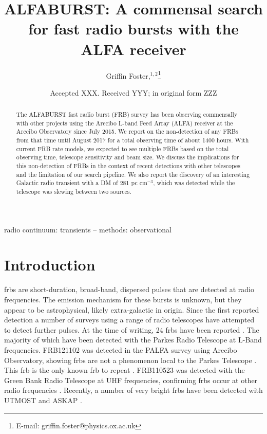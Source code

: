 \documentclass[a4paper,fleqn,usenatbib]{mnras}
\title[The ALFABURST Commensal FRB Survey]{ALFABURST: A commensal search for
fast radio bursts with the ALFA receiver}
\author[G. Foster et al.]{
Griffin Foster,$^{1,2}$\thanks{E-mail: griffin.foster@physics.ox.ac.uk}
\\
}
\date{Accepted XXX. Received YYY; in original form ZZZ}
\begin{document}
\label{firstpage}
\pagerange{\pageref{firstpage}--\pageref{lastpage}}
\maketitle

\begin{abstract}
The ALFABURST fast radio burst (FRB) survey has been observing commensally with
other projects using the Arecibo L-band Feed Array (ALFA) receiver at the Arecibo 
Observatory since July 2015. We report on the non-detection of any FRBs from that 
time until August 2017 for a total observing time of about 1400 hours. With current 
FRB rate models, we expected to see multiple FRBs based on the
total observing time, telescope sensitivity and beam size. We discuss the
implications for this non-detection of FRBs in the context of recent detections
with other telescopes and the limitation of our search pipeline. We also report the 
discovery of an interesting Galactic radio transient with a DM of 281 pc cm$^{-3}$, 
which was detected while the telescope was slewing between two sources.
\end{abstract}

\begin{keywords}
radio continuum: transients -- methods: observational
\end{keywords}


\section{Introduction}
\label{sec:intro}

\glspl{frb} are short-duration, broad-band, dispersed pulses that are detected
at radio frequencies. The emission mechanism for these bursts is unknown, but
they appear to be astrophysical, likely extra-galactic in origin. Since the
first reported detection \citep{2007Sci...318..777L} a number of surveys using a
range of radio telescopes have attempted to detect further pulses.  At the time
of writing, 24 \glspl{frb} have been reported \citep[for an up-to-date list,
see][]{2016PASA...33...45P}. The majority of which have been detected with the
Parkes Radio Telescope at L-Band frequencies. FRB121102 was detected in the
PALFA survey using Arecibo Observatory, showing \glspl{frb} are not a phenomenon
local to the Parkes Telescope \citep{2014ApJ...790..101S}. This \gls{frb} is the
only known \gls{frb} to repeat \citep{2016ApJ...833..177S}.  FRB110523 was
detected with the Green Bank Radio Telescope at UHF frequencies, confirming
\glspl{frb} occur at other radio frequencies \citep{2015Natur.528..523M}.
Recently, a number of very bright \glspl{frb} have been detected with UTMOST
\citep{2017MNRAS.468.3746C,atel10697} and ASKAP \citep{2017ApJ...841L..12B}.
\end{document}
